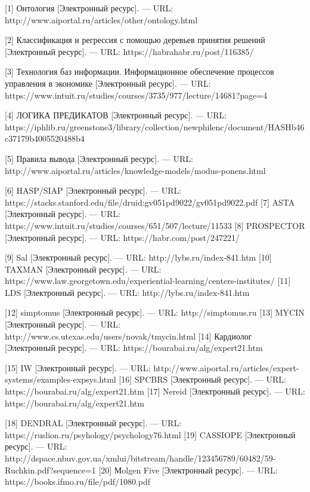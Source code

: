 \documentclass[14pt,a4paper,report]{report}
\begin{document}
\begin{flushleft}

[1] Онтология [Электронный ресурс]. — URL: http://www.aiportal.ru/articles/other/ontology.html

[2] Классификация и регрессия с помощью деревьев принятия решений [Электронный ресурс]. — URL: https://habrahabr.ru/post/116385/

[3] Технология баз информации. Информационное обеспечение процессов управления в экономике [Электронный ресурс]. — URL: https://www.intuit.ru/studies/courses/3735/977/lecture/14681?page=4

[4] ЛОГИКА ПРЕДИКАТОВ [Электронный ресурс]. — URL: https://iphlib.ru/greenstone3/library/collection/newphilenc/document/HASHb46c37179b4005520488b4

[5] Правила вывода [Электронный ресурс]. — URL: http://www.aiportal.ru/articles/knowledge-models/modus-ponens.html

[6] HASP/SIAP [Электронный ресурс]. — URL: https://stacks.stanford.edu/file/druid:gv051pd9022/gv051pd9022.pdf
[7] ASTA [Электронный ресурс]. — URL: https://www.intuit.ru/studies/courses/651/507/lecture/11533
[8] PROSPECTOR [Электронный ресурс]. — URL: https://habr.com/post/247221/

[9] Sal [Электронный ресурс]. — URL: http://lybs.ru/index-841.htm
[10] TAXMAN [Электронный ресурс]. — URL: https://www.law.georgetown.edu/experiential-learning/centers-institutes/
[11] LDS [Электронный ресурс]. — URL: http://lybs.ru/index-841.htm

[12] simptomus [Электронный ресурс]. — URL: http://simptomus.ru
[13] MYCIN [Электронный ресурс]. — URL: http://www.cs.utexas.edu/users/novak/tmycin.html
[14] Кардиолог [Электронный ресурс]. — URL: https://bourabai.ru/alg/expert21.htm

[15] IW [Электронный ресурс]. — URL: http://www.aiportal.ru/articles/expert-systems/examples-expsys.html
[16] SPCBRS [Электронный ресурс]. — URL: https://bourabai.ru/alg/expert21.htm
[17] Nereid [Электронный ресурс]. — URL: https://bourabai.ru/alg/expert21.htm

[18] DENDRAL [Электронный ресурс]. — URL: https://ruslion.ru/psyhology/psychology76.html
[19] CASSIOPE [Электронный ресурс]. — URL: http://dspace.nbuv.gov.ua/xmlui/bitstream/handle/123456789/60482/59-Ruchkin.pdf?sequence=1
[20] Мolgen Five [Электронный ресурс]. — URL: https://books.ifmo.ru/file/pdf/1080.pdf


\end{flushleft}
\end{document}
